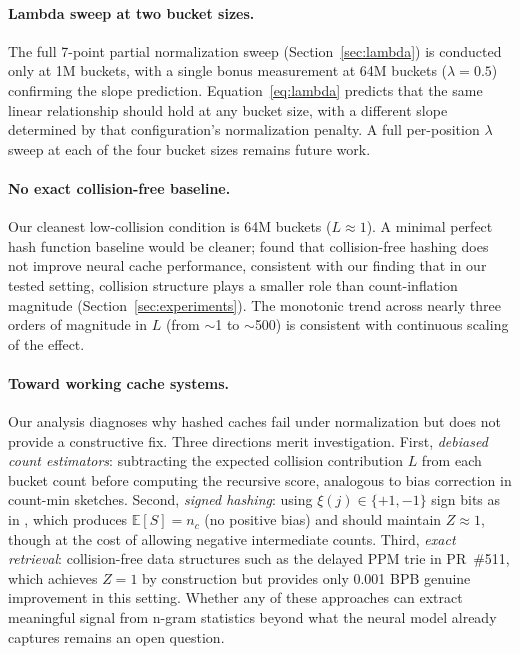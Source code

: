 \documentclass[11pt]{article}
\newcommand{\E}{\mathbb{E}}
\begin{document}
\paragraph{Lambda sweep at two bucket sizes.} The full 7-point partial normalization sweep (Section~\ref{sec:lambda}) is conducted only at 1M buckets, with a single bonus measurement at 64M buckets ($\lambda = 0.5$) confirming the slope prediction. Equation~\ref{eq:lambda} predicts that the same linear relationship should hold at any bucket size, with a different slope determined by that configuration's normalization penalty. A full per-position $\lambda$ sweep at each of the four bucket sizes remains future work.

\paragraph{No exact collision-free baseline.} Our cleanest low-collision condition is 64M buckets ($L \approx 1$). A minimal perfect hash function baseline would be cleaner; \citet{lin2026engram} found that collision-free hashing does not improve neural cache performance, consistent with our finding that in our tested setting, collision structure plays a smaller role than count-inflation magnitude (Section~\ref{sec:experiments}). The monotonic trend across nearly three orders of magnitude in $L$ (from $\sim$1 to $\sim$500) is consistent with continuous scaling of the effect.

\paragraph{Toward working cache systems.} Our analysis diagnoses why hashed caches fail under normalization but does not provide a constructive fix. Three directions merit investigation. First, \emph{debiased count estimators}: subtracting the expected collision contribution $L$ from each bucket count before computing the recursive score, analogous to bias correction in count-min sketches. Second, \emph{signed hashing}: using $\xi(j) \in \{+1, -1\}$ sign bits as in \citet{weinberger2009feature}, which produces $\E[S] = n_c$ (no positive bias) and should maintain $Z \approx 1$, though at the cost of allowing negative intermediate counts. Third, \emph{exact retrieval}: collision-free data structures such as the delayed PPM trie in PR~\#511, which achieves $Z = 1$ by construction but provides only 0.001 BPB genuine improvement in this setting. Whether any of these approaches can extract meaningful signal from n-gram statistics beyond what the neural model already captures remains an open question.
\end{document}
